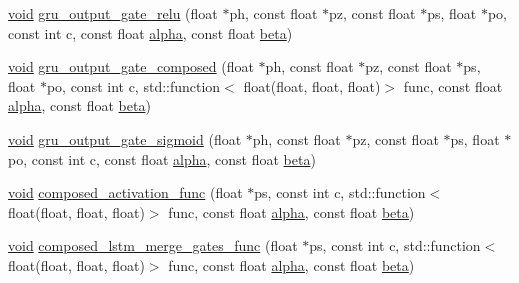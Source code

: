 \begin{DoxyCompactItemize}
\item 
\mbox{\hyperlink{mlasi_8h_a88f941d423cb2a819b70a1358982b1a6}{void}} \mbox{\hyperlink{namespaceonnxruntime_1_1rnn_1_1detail_1_1deepcpu_a020e1f61b777f9731726419e8cc6057d}{gru\+\_\+output\+\_\+gate\+\_\+relu}} (float $\ast$ph, const float $\ast$pz, const float $\ast$ps, float $\ast$po, const int c, const float \mbox{\hyperlink{mlasi_8h_a1763355f32e1812e5cb3a0080e7cca12}{alpha}}, const float \mbox{\hyperlink{mlasi_8h_a5fd37d216981b4cd9a19e29b5acd48d4}{beta}})
\item 
\mbox{\hyperlink{mlasi_8h_a88f941d423cb2a819b70a1358982b1a6}{void}} \mbox{\hyperlink{namespaceonnxruntime_1_1rnn_1_1detail_1_1deepcpu_a2ad004b217fbf44c0b3c813b6aefd876}{gru\+\_\+output\+\_\+gate\+\_\+composed}} (float $\ast$ph, const float $\ast$pz, const float $\ast$ps, float $\ast$po, const int c, std\+::function$<$ float(float, float, float)$>$ func, const float \mbox{\hyperlink{mlasi_8h_a1763355f32e1812e5cb3a0080e7cca12}{alpha}}, const float \mbox{\hyperlink{mlasi_8h_a5fd37d216981b4cd9a19e29b5acd48d4}{beta}})
\item 
\mbox{\hyperlink{mlasi_8h_a88f941d423cb2a819b70a1358982b1a6}{void}} \mbox{\hyperlink{namespaceonnxruntime_1_1rnn_1_1detail_1_1deepcpu_a7d9cf1331cc4a7af8a2e3d65165ea56c}{gru\+\_\+output\+\_\+gate\+\_\+sigmoid}} (float $\ast$ph, const float $\ast$pz, const float $\ast$ps, float $\ast$po, const int c, const float \mbox{\hyperlink{mlasi_8h_a1763355f32e1812e5cb3a0080e7cca12}{alpha}}, const float \mbox{\hyperlink{mlasi_8h_a5fd37d216981b4cd9a19e29b5acd48d4}{beta}})
\item 
\mbox{\hyperlink{mlasi_8h_a88f941d423cb2a819b70a1358982b1a6}{void}} \mbox{\hyperlink{namespaceonnxruntime_1_1rnn_1_1detail_1_1deepcpu_aed42d86aab19336ba36bd825717e9b96}{composed\+\_\+activation\+\_\+func}} (float $\ast$ps, const int c, std\+::function$<$ float(float, float, float)$>$ func, const float \mbox{\hyperlink{mlasi_8h_a1763355f32e1812e5cb3a0080e7cca12}{alpha}}, const float \mbox{\hyperlink{mlasi_8h_a5fd37d216981b4cd9a19e29b5acd48d4}{beta}})
\item 
\mbox{\hyperlink{mlasi_8h_a88f941d423cb2a819b70a1358982b1a6}{void}} \mbox{\hyperlink{namespaceonnxruntime_1_1rnn_1_1detail_1_1deepcpu_ae0681862958cc7ac5a8b2f361cc4a800}{composed\+\_\+lstm\+\_\+merge\+\_\+gates\+\_\+func}} (float $\ast$ps, const int c, std\+::function$<$ float(float, float, float)$>$ func, const float \mbox{\hyperlink{mlasi_8h_a1763355f32e1812e5cb3a0080e7cca12}{alpha}}, const float \mbox{\hyperlink{mlasi_8h_a5fd37d216981b4cd9a19e29b5acd48d4}{beta}})

\end{DoxyCompactItemize}
